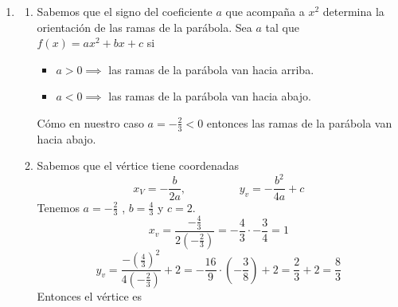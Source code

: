 \documentclass[12pt]{article}
\begin{document}
\begin{enumerate}
\begin{enumerate}
\begin{center}
\begin{tikzpicture}[scale=0.6]
    \end{tikzpicture}
\end{center}
        \item Consideremos $h(x) = f(x-2)$ y $g(x) = h(x) + 2$. Notemos que $h(x)$ es desplazar horizontalmente $f(x)$ dos unidades a la derecha y $g(x)$ es desplazar $h(x)$ dos unidades hacia arriba.
        \begin{equation*}
            g(x) = 
            f(x-2) + 2 = \frac{2}{3} (x-2) +2 
        \end{equation*}
        Por lo que las transformaciones que se le realizan a $f(x)$ es un desplazamiento horizontal dos unidades a la derecha y luego un desplazamiento vertical 2 unidades hacia arriba.
    \end{enumerate}
    \item 
        \begin{enumerate}
            \item Sabemos que el signo del coeficiente $a$ que acompaña a $x^{2}$ determina la orientación de las ramas de la parábola.
            Sea $a$ tal que $f(x) = ax^{2}+bx+c$ si
                \begin{itemize}
                    \item $a>0 \implies $ las ramas de la parábola van hacia arriba.
                    \item $a<0 \implies$ las ramas de la parábola van hacia abajo. 
                \end{itemize}
            Cómo en nuestro caso $a = -\frac{2}{3} < 0$ entonces las ramas de la parábola van hacia abajo.
            \item Sabemos que el vértice tiene coordenadas
            \begin{equation*}
                x_V = -\frac{b}{2a}, \hspace{2cm} y_v = -\frac{b^{2}}{4a}+c
            \end{equation*}
            Tenemos $a=-\frac{2}{3}$ , $b = \frac{4}{3}$ y $c = 2$.
            \begin{equation*}
                x_v = \frac{-\frac{4}{3}}{2(-\frac{2}{3})} = -\frac{4}{3} \cdot -\frac{3}{4} = 1 
            \end{equation*}
            \begin{equation*}
                y_v = \frac{-(\frac{4}{3})^{2}}{4 (-\frac{2}{3})} +2 = -\frac{16}{9}\cdot(-\frac{3}{8}) +2 = \frac{2}{3} + 2 = \frac{8}{3}
            \end{equation*}
            Entonces el vértice es 

\end{enumerate}
\end{enumerate}
\end{document}

